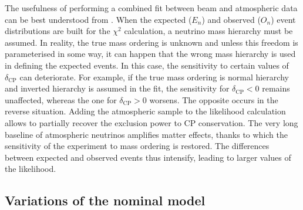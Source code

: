 The usefulness of performing a combined fit between beam and atmospheric %
data can be best understood from .
When the expected ($E_n$) and observed ($O_n$) event distributions are built for the $\chi^2$ calculation, %
a neutrino mass hierarchy must be assumed.
In reality, the true mass ordering is unknown and unless this freedom is parameterised in some way, %
it can happen that the wrong mass hierarchy is used in defining the expected events.
In this case, the sensitivity to certain values of $\delta_\text{CP}$ can deteriorate.
For example, if the true mass ordering is normal hierarchy and inverted hierarchy is assumed in the fit, %
the sensitivity for $\delta_\text{CP} < 0$ remains unaffected, whereas the one for $\delta_\text{CP} > 0$ worsens.
The opposite occurs in the reverse situation.
Adding the atmospheric sample to the likelihood calculation allows to partially recover the exclusion power to CP conservation.
The very long baseline of atmospheric neutrinos amplifies matter effects, thanks to which the sensitivity %
of the experiment to mass ordering is restored.
The differences between expected and observed events thus intensify, leading to larger values of the likelihood.


\subsection{Variations of the nominal model}
\label{sec:variations}

